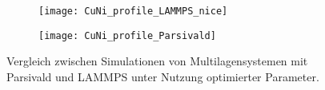 \begin{figure}
  \captionsetup[subfigure]{singlelinecheck=false}
  \def\subfigwidth{7cm}
  \begin{subfigure}[t]{\subfigwidth}
    \texttt{[image: CuNi\_profile\_LAMMPS\_nice]}
  \end{subfigure}
  \hfill
  \begin{subfigure}[t]{\subfigwidth}
    \texttt{[image: CuNi\_profile\_Parsivald]}
  \end{subfigure}
  \caption[Vergleich zwischen Simulationen von Multilagensystemen mit Parsivald und LAMMPS]{
    Vergleich zwischen Simulationen von Multilagensystemen mit Parsivald und LAMMPS unter Nutzung optimierter Parameter.
  }
  \label{fig:multilayerresults}
\end{figure}
